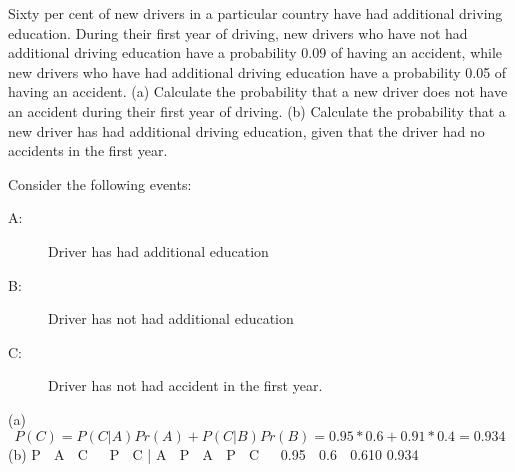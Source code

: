 \documentclass[a4paper,12pt]{article}
\begin{document}
Sixty per cent of new drivers in a particular country have had additional driving education. During their first year of driving, new drivers who have not had additional
driving education have a probability 0.09 of having an accident, while new drivers who have had additional driving education have a probability 0.05 of having an
accident.
(a) Calculate the probability that a new driver does not have an accident during
their first year of driving.
(b) Calculate the probability that a new driver has had additional driving
education, given that the driver had no accidents in the first year.


\newpage
Consider the following events:
\begin{description}
\item[A:] Driver has had additional education
\item[B:] Driver has not had additional education
\item[C:] Driver has not had accident in the first year.
\end{description}
(a)
\[P(C) = P(C|A) Pr(A) + P(C|B) Pr(B) = 0.95*0.6 + 0.91*0.4
= 0.934\]
(b)
P  A  C  
P  C | A  P  A 
P  C 

0.95  0.6
 0.610
0.934
\end{document}
